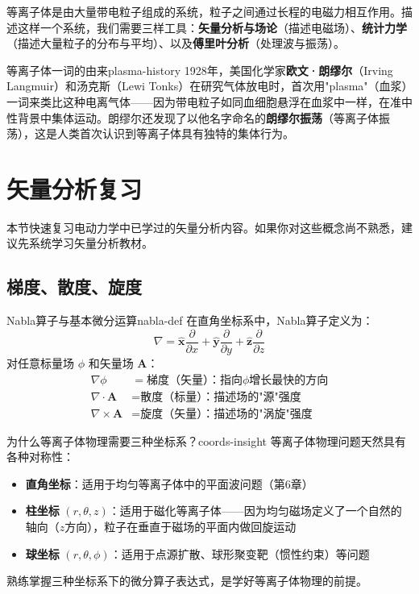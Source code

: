 \documentclass[12pt,a4paper,openany,oneside]{book}
\newcommand{\vect}[1]{\bm{#1}}
\newcommand{\unitvec}[1]{\hat{\vect{#1}}}
\newcommand{\grad}{\nabla}
\newcommand{\curl}{\nabla\times}
\newcommand{\divg}{\nabla\cdot}
\newcommand{\difficulty}[1]{\marginnote{\textcolor{red}{\textbf{[#1]}}}}
\begin{document}
等离子体是由大量带电粒子组成的系统，粒子之间通过长程的电磁力相互作用。描述这样一个系统，我们需要三样工具：\textbf{矢量分析与场论}（描述电磁场）、\textbf{统计力学}（描述大量粒子的分布与平均）、以及\textbf{傅里叶分析}（处理波与振荡）。

\begin{history}{等离子体一词的由来}{plasma-history}
1928年，美国化学家\textbf{欧文·朗缪尔}（Irving Langmuir）和汤克斯（Lewi Tonks）在研究气体放电时，首次用"plasma"（血浆）一词来类比这种电离气体——因为带电粒子如同血细胞悬浮在血浆中一样，在准中性背景中集体运动。朗缪尔还发现了以他名字命名的\textbf{朗缪尔振荡}（等离子体振荡），这是人类首次认识到等离子体具有独特的集体行为。
\end{history}

\section{矢量分析复习}\difficulty{基础}

本节快速复习电动力学中已学过的矢量分析内容。如果你对这些概念尚不熟悉，建议先系统学习矢量分析教材。

\subsection{梯度、散度、旋度}

\begin{definition}{Nabla算子与基本微分运算}{nabla-def}
在直角坐标系中，Nabla算子定义为：
\[
\grad = \unitvec{x}\frac{\partial}{\partial x} + \unitvec{y}\frac{\partial}{\partial y} + \unitvec{z}\frac{\partial}{\partial z}
\]
对任意标量场 $\phi$ 和矢量场 $\vect{A}$：
\begin{align*}
\grad\phi &= \text{梯度（矢量）：指向}\phi\text{增长最快的方向} \\
\divg\vect{A} &= \text{散度（标量）：描述场的"源"强度} \\
\curl\vect{A} &= \text{旋度（矢量）：描述场的"涡旋"强度}
\end{align*}
\end{definition}

\begin{insight}{为什么等离子体物理需要三种坐标系？}{coords-insight}
等离子体物理问题天然具有各种对称性：
\begin{itemize}
\item \textbf{直角坐标}：适用于均匀等离子体中的平面波问题（第6章）
\item \textbf{柱坐标} $(r,\theta,z)$：适用于磁化等离子体——因为均匀磁场定义了一个自然的轴向（$z$方向），粒子在垂直于磁场的平面内做回旋运动
\item \textbf{球坐标} $(r,\theta,\phi)$：适用于点源扩散、球形聚变靶（惯性约束）等问题
\end{itemize}
熟练掌握三种坐标系下的微分算子表达式，是学好等离子体物理的前提。
\end{insight}
\end{document}
